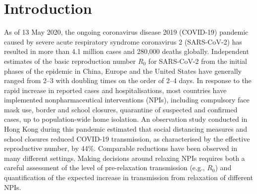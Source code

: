 \section{Introduction}
As of 13 May 2020, the ongoing coronavirus disease 2019 (COVID-19) pandemic caused by severe acute respiratory syndrome coronavirus 2 (SARS-CoV-2) has resulted in more than 4.1 million cases and 280,000 deaths globally\cite{WHO:WHOSituationReport:2020}. Independent estimates of the basic reproduction number $R_0$ for SARS-CoV-2 from the initial phases of the epidemic in China, Europe and the United States have generally ranged from 2–3 with doubling times on the order of 2–4 days. In response to the rapid increase in reported cases and hospitalisations, most countries have implemented nonpharmaceutical interventions (NPIs), including compulsory face mask use, border and school closures, quarantine of suspected and confirmed cases, up to population-wide home isolation\cite{HITCOVIDTeam:HealthInterventionsTracking:2020}. An observation study conducted in Hong Kong during this pandemic estimated that social distancing measures and school closures reduced COVID-19 transmission, as characterised by the effective reproductive number, by 44\%\cite{Cowling:ImpactAssessmentNonpharmaceutical:2020}. Comparable reductions have been observed in many different settings\cite{Flaxman:Report13Estimating:2020}. Making decisions around relaxing NPIs requires both a careful assessment of the level of pre-relaxation transmission (e.g., $R_0$) and quantification of the expected increase in transmission from relaxation of different NPIs. 

